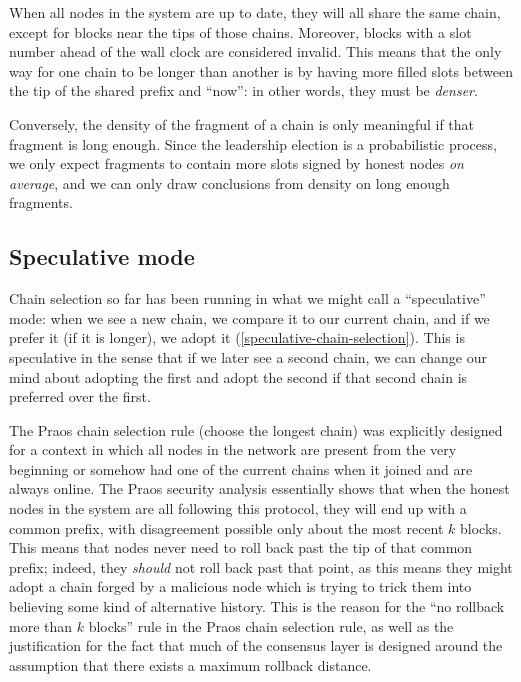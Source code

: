 When all nodes in the system are up to date, they will all share the same
chain, except for blocks near the tips of those chains. Moreover, blocks with a
slot number ahead of the wall clock are considered invalid. This means that
the only way for one chain to be longer than another is by having more filled
slots between the tip of the shared prefix and ``now'': in other words, they
must be \emph{denser}.
%
\begin{center}
\end{center}
%
Conversely, the density of the fragment of a chain is only meaningful if that
fragment is long enough. Since the leadership election is a probabilistic
process, we only expect fragments to contain more slots signed by honest nodes
\emph{on average}, and we can only draw conclusions from density on long enough
fragments.

\subsection{Speculative mode}

Chain selection so far has been running in what we might call a ``speculative''
mode: when we see a new chain, we compare it to our current chain, and if we
prefer it (if it is longer), we adopt it (\cref{speculative-chain-selection}). This
is speculative in the sense that if we later see a second chain, we can change
our mind about adopting the first and adopt the second if that second chain is
preferred over the first.

The Praos chain selection rule (choose the longest chain) was explicitly
designed for a context in which all nodes in the network are present from the
very beginning or somehow had one of the current chains when it joined and are always online. The Praos security analysis
\cite{cryptoeprint:2017:573} essentially shows that when the honest nodes in the
system are all following this protocol, they will end up with a common prefix,
with disagreement possible only about the most recent $k$ blocks. This means that
nodes never need to roll back past the tip of that common prefix; indeed, they
\emph{should} not roll back past that point, as this means they might adopt
a chain forged by a malicious node which is trying to trick them into believing
some kind of alternative history. This is the reason for the ``no rollback more
than $k$ blocks'' rule in the Praos chain selection rule, as well as the
justification for the fact that much of the consensus layer is designed around
the assumption that there exists a maximum rollback distance.

